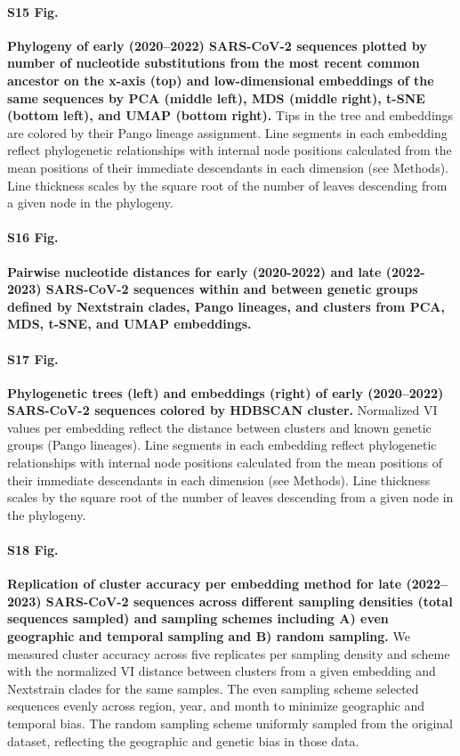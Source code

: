 \documentclass[10pt,letterpaper]{article}
\begin{document}
\paragraph*{S15 Fig.}
\label{S_Fig_sarscov2_early_embeddings_by_Nextclade_pango}
{\bf Phylogeny of early (2020--2022) SARS-CoV-2 sequences plotted by number of nucleotide substitutions from the most recent common ancestor on the x-axis (top) and low-dimensional embeddings of the same sequences by PCA (middle left), MDS (middle right), t-SNE (bottom left), and UMAP (bottom right).}
Tips in the tree and embeddings are colored by their Pango lineage assignment.
Line segments in each embedding reflect phylogenetic relationships with internal node positions calculated from the mean positions of their immediate descendants in each dimension (see Methods).
Line thickness scales by the square root of the number of leaves descending from a given node in the phylogeny.

\paragraph*{S16 Fig.}
\label{S_Fig_sarscov2_within_between_group_distances}
{\bf Pairwise nucleotide distances for early (2020-2022) and late (2022-2023) SARS-CoV-2 sequences within and between genetic groups defined by Nextstrain clades, Pango lineages, and clusters from PCA, MDS, t-SNE, and UMAP embeddings.}

\paragraph*{S17 Fig.}
\label{S_Fig_sarscov2_early_embeddings_by_cluster_vs_Nextclade_pango}
{\bf Phylogenetic trees (left) and embeddings (right) of early (2020--2022) SARS-CoV-2 sequences colored by HDBSCAN cluster.}
Normalized VI values per embedding reflect the distance between clusters and known genetic groups (Pango lineages).
Line segments in each embedding reflect phylogenetic relationships with internal node positions calculated from the mean positions of their immediate descendants in each dimension (see Methods).
Line thickness scales by the square root of the number of leaves descending from a given node in the phylogeny.

\paragraph*{S18 Fig.}
\label{S_Fig_late_sarscov2_replication_of_cluster_accuracy}
{\bf Replication of cluster accuracy per embedding method for late (2022--2023) SARS-CoV-2 sequences across different sampling densities (total sequences sampled) and sampling schemes including A) even geographic and temporal sampling and B) random sampling.}
We measured cluster accuracy across five replicates per sampling density and scheme with the normalized VI distance between clusters from a given embedding and Nextstrain clades for the same samples.
The even sampling scheme selected sequences evenly across region, year, and month to minimize geographic and temporal bias.
The random sampling scheme uniformly sampled from the original dataset, reflecting the geographic and genetic bias in those data.
\end{document}
